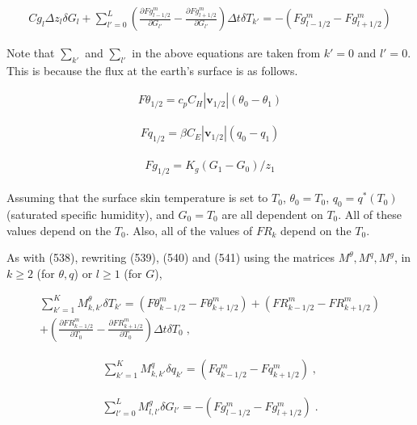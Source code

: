 \begin{eqnarray}
  Cg_l \Delta z_l \delta G_l
  +  \sum_{l'=0}^{L} \left(  \frac{\partial{Fg^{m}_{l-1/2}}}{\partial {G_{l'}}}
                            - \frac{\partial{Fg^{m}_{l+1/2}}}{\partial {G_{l'}}} \right)
                 \Delta t\delta T_{k'}
  = - ( Fg^{m}_{l-1/2} - Fg^{m}_{l+1/2} )
\end{eqnarray}

Note that \(\sum_{k'}\) and \(\sum_{l'}\) in the above equations are
taken from \(k'=0\) and \(l'=0\). This is because the flux at the
earth's surface is as follows.

\begin{eqnarray}
  F\theta_{1/2} =  c_p C_H |{\mathbf{v}}_{1/2}| (\theta_0 - \theta_1)
\end{eqnarray}

\begin{eqnarray}
  Fq_{1/2} =  \beta C_E |{\mathbf{v}}_{1/2}| (q_0 - q_1)
\end{eqnarray}

\begin{eqnarray}
  Fg_{1/2} =  K_g (G_1 - G_0)/z_1
\end{eqnarray}

Assuming that the surface skin temperature is set to \(T_0\),
\(\theta_0 = T_0\), \(q_0 = q^*(T_0)\) (saturated specific humidity),
and \(G_0 = T_0\) are all dependent on \(T_0\). All of these values
depend on the \(T_0\). Also, all of the values of \(FR_{k}\) depend on
the \(T_0\).

As with (538), rewriting (539), (540) and (541) using the matrices
\(M^{\theta}, M^q, M^g\), in \(k \ge 2\) (for \(\theta, q\)) or
\(l \ge 1\) (for \(G\)),

\begin{eqnarray}
    \sum_{k'=1}^{K}  M^\theta_{k,k'} \delta T_{k'}
        =  (F\theta^{m}_{k-1/2} - F\theta^{m}_{k+1/2})
        + (FR^{m}_{k-1/2} - FR^{m}_{k+1/2})   \\
 +  \left(\frac{\partial{FR^{m}_{k-1/2}}}{\partial {T_0}} - \frac{\partial{FR^{m}_{k+1/2}}}{\partial {T_0}} \right)
     \Delta t\delta T_0 \; ,
\end{eqnarray}

\begin{eqnarray}
 \sum_{k'=1}^{K}  M^q_{k,k'} \delta q_{k'}
         = (Fq^{m}_{k-1/2} - Fq^{m}_{k+1/2}) \; ,
\end{eqnarray}

\begin{eqnarray}
  \sum_{l'=0}^{L} M^g_{l,l'} \delta G_{l'}
         = - (Fg^{m}_{l-1/2} - Fg^{m}_{l+1/2}) \; .
\end{eqnarray}

